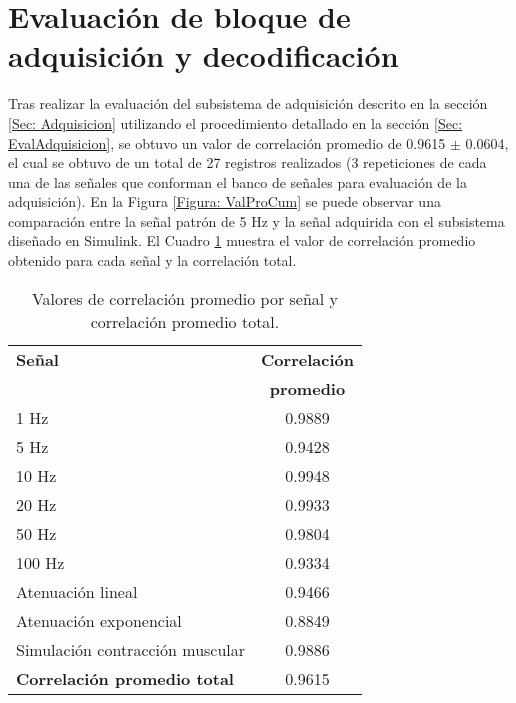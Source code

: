 
\section{Evaluación de bloque de adquisición y decodificación}
Tras realizar la evaluación del subsistema de adquisición descrito en la sección \ref{Sec: Adquisicion} utilizando el procedimiento detallado en la sección \ref{Sec: EvalAdquisicion}, se obtuvo un valor de correlación promedio de 0.9615 $\pm$ 0.0604, el cual se obtuvo de un total de 27 registros realizados (3 repeticiones de cada una de las señales que conforman el banco de señales para evaluación de la adquisición). En la Figura \ref{Figura: ValProCum} se puede observar una comparación entre la señal patrón de 5 Hz y la señal adquirida con el subsistema diseñado en Simulink\textregistered. El Cuadro \ref{Cuadro:ValoresCorre} muestra el valor de correlación promedio obtenido para cada señal y la correlación total.

\begin{table}[htbp]
	\centering
	\begin{tabular}{|l|c|}
	\hline
	\textbf{Señal} & \textbf{Correlación}\\ 
	\textbf{} & \textbf{promedio}\\ \hline	\hline
	1 Hz & 0.9889\\ \hline
	5 Hz & 0.9428\\ \hline
	10 Hz & 0.9948\\ \hline
	20 Hz & 0.9933\\ \hline
	50 Hz & 0.9804\\ \hline
	100 Hz & 0.9334\\ \hline
	Atenuación lineal & 0.9466\\ \hline
	Atenuación exponencial & 0.8849\\ \hline
	Simulación contracción muscular & 0.9886\\ \hline
	\textbf{Correlación promedio total} & 0.9615\\ \hline
	\end{tabular}
	\caption{Valores de correlación promedio por señal y correlación promedio total.}
	\label{Cuadro:ValoresCorre}
\end{table}


